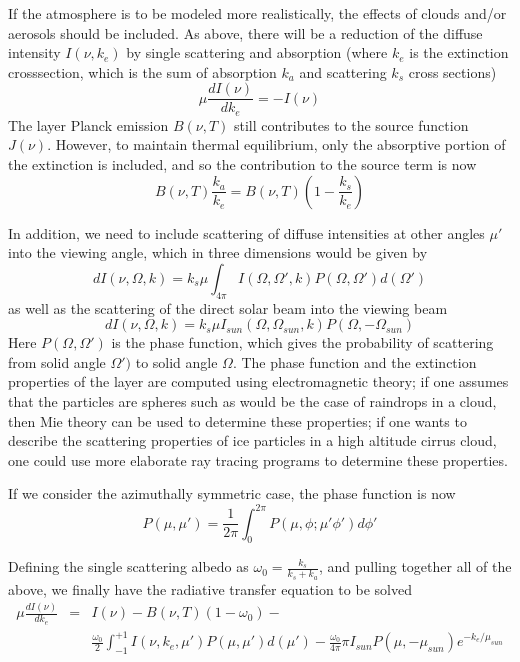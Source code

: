\documentclass[12pt]{article}
\begin{document}
{{{{If the atmosphere is to be modeled more realistically, the effects of 
clouds and/or aerosols should be included. As above, there will be 
a reduction of the diffuse intensity $I(\nu,k_{e})$ by single scattering and
absorption (where $k_{e}$ is the extinction crosssection, which is the sum 
of absorption $k_{a}$ and scattering $k_{s}$ cross sections) 
\cite{lio:80,goo:89}
\[
\mu \frac{dI(\nu)}{dk_{e}} = -I(\nu)
\]
The layer Planck emission $B(\nu,T)$ still contributes to the source function 
$J(\nu)$. However, to maintain thermal equilibrium, only the absorptive 
portion of the extinction is included, and so the contribution to the
source term is now
\[
B(\nu,T) \frac{k_{a}}{k_{e}} = B(\nu,T) \left(1 - \frac{k_{s}}{k_{e}} \right) 
\]

In addition, we need to include scattering of diffuse intensities at 
other angles $\mu\prime$ into the viewing angle, which in three dimensions 
would be given by \cite{lio:80,goo:89}
\[
dI(\nu,\Omega,k) = k_{s} \mu \int_{4\pi} I(\Omega,\Omega\prime,k) 
P(\Omega,\Omega\prime) d(\Omega\prime)
\]
as well as the scattering of the direct solar beam into the viewing beam
\cite{lio:80,goo:89}
\[
dI(\nu,\Omega,k) = k_{s} \mu I_{sun}(\Omega,\Omega_{sun},k) 
P(\Omega,-\Omega_{sun}) 
\]
Here $P(\Omega,\Omega\prime)$ is the phase function, which gives the 
probability of scattering from solid angle $\Omega\prime)$ to solid angle
$\Omega$. The phase function and the extinction properties of the layer are
computed using electromagnetic theory; if one assumes that the particles are
spheres such as would be the case of raindrops in a cloud, then Mie theory 
\cite{van:82,lio:80,boh:98} can be used to determine these properties; if
one wants to describe the scattering properties of ice particles in a high
altitude cirrus cloud, one could use more elaborate ray tracing programs to 
determine these properties. 

If we consider  the azimuthally symmetric case, the phase function is now 
\cite{lio:80}
\[
P(\mu,\mu\prime) =  \frac{1}{2\pi} \int_{0}^{2\pi} 
P(\mu,\phi;\mu\prime \phi\prime) d\phi\prime
\]

Defining the single scattering albedo as
 $\omega_{0} = \frac{k_{s}}{k_{s}+k_{a}}$, and pulling together all of
the above, we finally have the radiative transfer equation to be solved 
\cite{lio:80,goo:89}
\[
\begin{array}{ccc}
\mu \frac{dI(\nu)}{dk_{e}} & = & I(\nu) - B(\nu,T)(1-\omega_{0}) - \\
& & 
\frac{\omega_{0}}{2}\int_{-1}^{+1} I(\nu,k_{e},\mu\prime) P(\mu,\mu\prime)
d(\mu\prime) - 
\frac{\omega_{0}}{4\pi} \pi I_{sun} P(\mu,-\mu_{sun}) e^{-k_{e}/\mu_{sun}} 
\end{array}
\]

}}}}
\end{document}

